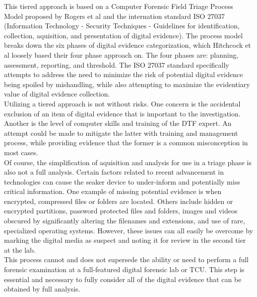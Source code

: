 \documentclass[12pt]{article}
\begin{document}
This tiered approach is based on a Computer Forensic Field Triage Process Model proposed
by Rogers et al \cite{rogers2006computer} and the internation standard ISO 27037
(Information Technology - Security Techniques - Guidelines for identification, collection,
aquisition, and presentation of digital evidence). The process model breaks down the six
phases of digital evidence categorization, which Hitchcock et al\cite{hitchcock2016tiered}
loosely based their four phase approach on.  The four phases are: planning, assessment,
reporting, and threshold.  The ISO 27037 standard specifically attempts to address the need
to minimize the risk of potential digital evidence being spoiled by mishandling, while also
attempting to maximize the evidentiary value of digital evidence collection.\\

Utilizing a tiered approach is not without risks.  One concern is the accidental exclusion
of an item of digital evidence that is important to the investigation.  Another is the
level of computer skills and training of the DTF expert.  An attempt could be made to
mitigate the latter with training and management process, while providing evidence that
the former is a common misconception in most cases\cite{rogers2006computer}.\\

Of course, the simplification of aquisition and analysis for use in a triage phase is also
not a full analysis. Certain factors related to recent advancement in technologies can cause
the \gls{seaker} device to under-inform and potentially miss critical information.  One
example of missing potential evidence is when encrypted, compressed files or folders
are located\cite{shaw2013practical}.  Others include hidden or encrypted partitions,
password protected files and folders, images and videos obscured by significantly altering
the filenames and extensions, and use of rare, specialized operating systems. However,
these issues can all easily be overcome by marking the digital media as suspect and noting
it for review in the second tier at the lab.\\

This process cannot and does not supersede the ability or need to perform a full forensic
examination at a full-featured digital forensic lab\cite{rogers2006computer} or TCU.  This
step is essential and necessary to fully consider all of the digital evidence that can
be obtained by full analysis.\\
\end{document}

